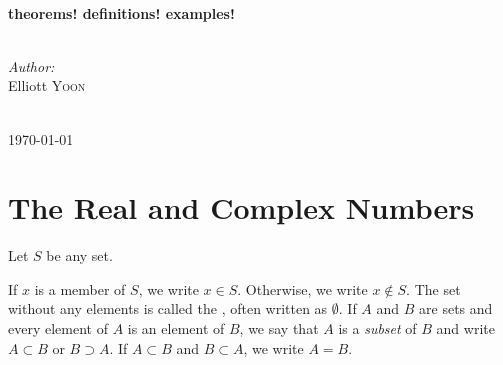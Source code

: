 \documentclass{article}
\begin{document}
\begin{titlepage}

\HRule \\[0.4cm]
{ \huge \bfseries theorems! definitions! examples!}\\[0.4cm] %
\HRule \\[1.5cm]
 

\begin{minipage}{0.4\textwidth}
\begin{flushleft} \large
\emph{Author:}\\
Elliott \textsc{Yoon}\\ %
\end{flushleft}

\end{minipage}\\[2cm]



{\large \today}\\[2cm] %

\vfill %

\end{titlepage}

\section{The Real and Complex Numbers}
\begin{definition}
    Let $S$ be any set.
    \begin{itemize}
        \ii If $x$ is a member of $S$, we write $x\in S$. Otherwise, we write $x\not\in S$.
        \ii The set without any elements is called the , often written as $\emptyset$.
        \ii If $A$ and $B$ are sets and every element of $A$ is an element of $B$, we say that $A$ is a \emph{subset} of $B$ and write $A\subset B$ or $B\supset A$. 
        \ii If $A\subset B$ and $B\subset A$, we write $A=B$.
    \end{itemize}   
\end{definition}
\end{document}
